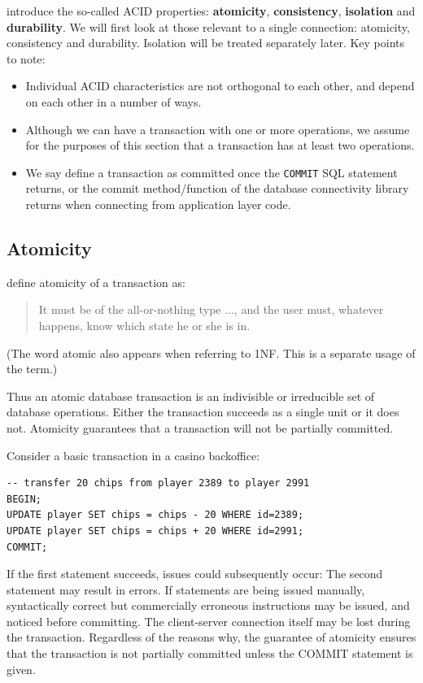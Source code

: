 \citet{haerder:1983:principles} introduce the so-called ACID properties: \textbf{atomicity}, \textbf{consistency}, \textbf{isolation} and \textbf{durability}.
We will first look at those relevant to a single connection: atomicity, consistency and durability.
Isolation will be treated separately later. Key points to note:
\begin{itemize}
\item Individual ACID characteristics are not orthogonal to each other, and depend on each other in a number of ways.
\item Although we can have a transaction with one or more operations, we assume for the purposes of this section that a transaction has at least two operations. 
\item We say define a transaction as committed once the  \texttt{COMMIT} SQL statement returns, or the commit method/function of the database connectivity library returns when connecting from application layer code.
\end{itemize}

\subsection{Atomicity}
\label{sec:atomicity}

\citet{haerder:1983:principles} define atomicity of a transaction as:
\begin{quotation}
  It must be of the all-or-nothing type ..., and the user must, whatever happens, know which state he or she is in.
\end{quotation}
(The word atomic also appears when referring to 1NF. This is a separate usage of the term.)

Thus an atomic database transaction is an indivisible or irreducible set of database operations.
Either the transaction succeeds as a single unit or it does not.
Atomicity guarantees that a transaction will not be partially committed.

Consider a basic transaction in a casino backoffice: 
\begin{verbatim}
-- transfer 20 chips from player 2389 to player 2991
BEGIN; 
UPDATE player SET chips = chips - 20 WHERE id=2389;
UPDATE player SET chips = chips + 20 WHERE id=2991;
COMMIT;
\end{verbatim}
If the first statement succeeds, issues could subsequently occur:
The second statement may result in errors.
If statements are being issued manually, syntactically correct but commercially erroneous instructions may be issued, and noticed before committing.
The client-server connection itself may be lost during the transaction.
Regardless of the reasons why, the guarantee of atomicity ensures that the transaction is not partially committed unless the COMMIT statement is given.


